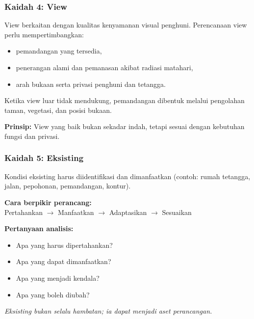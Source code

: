 \documentclass[../main.tex]{subfiles}
\begin{document}
\begin{frame}[mytitle=standard, c, mycolor=digiPH_darkblue, dark]
	\frametitle{Kaidah 4: View}

	View berkaitan dengan kualitas kenyamanan visual penghuni. Perencanaan view perlu mempertimbangkan:
	\begin{itemize}
		\item pemandangan yang tersedia,
		\item penerangan alami dan pemanasan akibat radiasi matahari,
		\item arah bukaan serta privasi penghuni dan tetangga.
	\end{itemize}

	Ketika view luar tidak mendukung, pemandangan dibentuk melalui pengolahan taman, vegetasi, dan posisi bukaan.

	\vspace{0.3cm}
	\textbf{Prinsip:} View yang baik bukan sekadar indah, tetapi sesuai dengan kebutuhan fungsi dan privasi.
\end{frame}

\begin{frame}[mytitle=standard, t, mycolor=digiPH_white, light]
	\frametitle{Kaidah 5: Eksisting}

	Kondisi eksisting harus diidentifikasi dan dimanfaatkan (contoh: rumah tetangga, jalan, pepohonan, pemandangan, kontur).

	\vspace{0.3cm}
	\textbf{Cara berpikir perancang:} \\
	Pertahankan $\rightarrow$ Manfaatkan $\rightarrow$ Adaptasikan $\rightarrow$ Sesuaikan

	\vspace{0.3cm}
	\textbf{Pertanyaan analisis:}
	\begin{itemize}
		\item Apa yang harus dipertahankan?
		\item Apa yang dapat dimanfaatkan?
		\item Apa yang menjadi kendala?
		\item Apa yang boleh diubah?
	\end{itemize}

	\textit{Eksisting bukan selalu hambatan; ia dapat menjadi aset perancangan.}
\end{frame}
\end{document}
